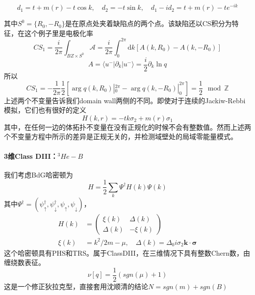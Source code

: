 \documentclass{article}
\numberwithin{equation}{subsection}
\begin{document}
\begin{equation}
    d_1=t+m(r)-t\cos k,\quad d_2=-t\sin k,\quad d_1-id_2=t+m(r)-te^{-ik}
\end{equation}
\begin{center}
\end{center}
其中$S^0=\{R_0,-R_0\}$是在原点处夹着缺陷点的两个点。该缺陷还以CS积分为特征，在这个例子里是电极化率
\begin{equation}
    CS_1=\frac{i}{2\pi}\int_{BZ\times S^0}\mathcal{A}=\frac{i}{2\pi}\int_{0}^{2\pi}\mathrm{d}k[A(k,R_0)-A(k,-R_0)]
\end{equation}
\begin{equation}
    A=\langle u^-|\partial_k|u^-\rangle=\frac{i}{2}\partial_k\ln q
\end{equation}
所以
\begin{equation}
    CS_1=-\frac{1}{2\pi}\frac{1}{2}[\arg q(k,R_0)|_0^{2\pi}-\arg q(k,-R_0)|_0^{2\pi}]=\frac{1}{2}\mod \mathbb{Z}
\end{equation}
上述两个不变量告诉我们domain wall两侧的不同。即使对于连续的Jackiw-Rebbi模拟，它们也有很好的定义
\begin{equation}
    H(k,r)=-tk\sigma_2+m(r)\sigma_1
\end{equation}
其中，在任何一边的体拓扑不变量在没有正规化的时候不会有整数值。然而上述两个不变量方程中所示的差异是正规无关的，并检测域壁处的局域零能量模式。  
\paragraph{3维Class DIII：$^3He-B$}
我们考虑BdG哈密顿为
\begin{equation}
    \hat{H}=\frac{1}{2}\sum_{k}\Psi^\dagger H(k)\Psi(k)
\end{equation}
其中$\Psi^\dagger=(\psi_{\uparrow}^\dagger,\psi_{\downarrow}^\dagger,\psi_{\uparrow},\psi_{\downarrow})$，
\begin{equation}
    \begin{split}
        H(k)&=\begin{pmatrix}
            \xi(k)&\Delta(k)\\
            \Delta(k)&-\xi(k)
        \end{pmatrix}\\
        \xi(k)&=k^2/2m-\mu,\quad \Delta(k)=\Delta_0i\sigma_2\mathbf{k}\cdot\bm{\sigma}
    \end{split}
\end{equation}
这个哈密顿具有PHS和TRS。属于ClassDIII，在三维情况下具有整数Chern数，由缠绕数表征。
\begin{equation}
    \nu[q]=\frac{1}{2}(sgn(\mu)+1)
\end{equation}
这是一个修正狄拉克型，直接套用沈顺清的结论$N=sgn(m)+sgn(B)$
\end{document}
